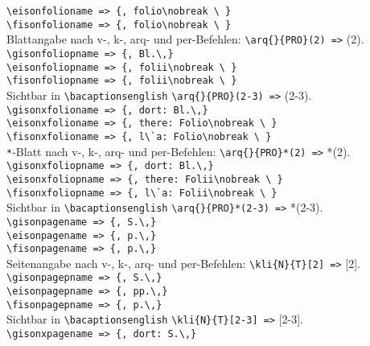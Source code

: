 \documentclass[12pt,a4paper]{article}
\begin{document}
{\verb|\eisonfolioname => {, folio\nobreak \ }| \\[-.8ex]
\verb|\fisonfolioname => {, folio\nobreak \ }| \\[-.2ex]
Blattangabe nach v-, k-, arq- und per-Befehlen: \verb|\arq{}{PRO}(2) =>| (2).
\\[.8ex]%
\verb|\gisonfoliopname => {, Bl.\,}| \\[-.8ex]
\verb|\eisonfoliopname => {, folii\nobreak \ }| \\[-.8ex]
\verb|\fisonfoliopname => {, folii\nobreak \ }| \\[-.2ex]
Sichtbar in {\bacaptionsenglish\verb|\bacaptionsenglish| \verb|\arq{}{PRO}(2-3) =>| (2-3).}
\\[.8ex]%
\verb|\gisonxfolioname => {, dort: Bl.\,}| \\[-.8ex]
\verb|\eisonxfolioname => {, there: Folio\nobreak \ }| \\[-.8ex]
\verb|\fisonxfolioname => {, l\`a: Folio\nobreak \ }| \\[-.2ex]
\verb|*|-Blatt nach v-, k-, arq- und per-Befehlen: \verb|\arq{}{PRO}*(2) =>| *(2).
\\[.8ex]%
\verb|\gisonxfoliopname => {, dort: Bl.\,}| \\[-.8ex]
\verb|\eisonxfoliopname => {, there: Folii\nobreak \ }| \\[-.8ex]
\verb|\fisonxfoliopname => {, l\`a: Folii\nobreak \ }| \\[-.2ex]
Sichtbar in {\bacaptionsenglish\verb|\bacaptionsenglish| \verb|\arq{}{PRO}*(2-3) =>| *(2-3).}
\\[.8ex]%
\verb|\gisonpagename => {, S.\,}| \\[-.8ex]
\verb|\eisonpagename => {, p.\,}| \\[-.8ex]
\verb|\fisonpagename => {, p.\,}| \\[-.2ex]
Seitenangabe nach v-, k-, arq- und per-Befehlen: \verb|\kli{N}{T}[2] =>| [2].
\\[.8ex]%
\verb|\gisonpagepname => {, S.\,}| \\[-.8ex]
\verb|\eisonpagepname => {, pp.\,}| \\[-.8ex]
\verb|\fisonpagepname => {, p.\,}| \\[-.2ex]
Sichtbar in {\bacaptionsenglish\verb|\bacaptionsenglish| \verb|\kli{N}{T}[2-3] =>| [2-3].}
\\[.8ex]%
\verb|\gisonxpagename => {, dort: S.\,}| \\[-.8ex]
}
\end{document}

